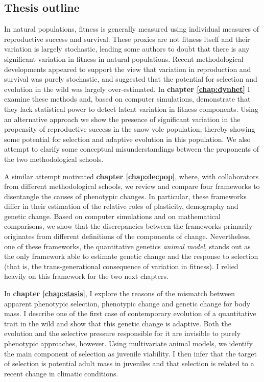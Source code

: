 \subsection{Thesis outline}

In natural populations, fitness is generally measured using individual measures of reproductive success and survival. These proxies are not fitness itself and their variation is largely stochastic, leading some authors to doubt that there is any significant variation in fitness in natural populations. Recent methodological developments appeared to support the view that variation in reproduction and survival was purely stochastic, and suggested that the potential for selection and evolution in the wild was largely over-estimated. In \textbf{chapter \ref{chap:dynhet}} I examine these methods and, based on computer simulations, demonstrate that they lack statistical power to detect latent variation in fitness components. Using an alternative approach we show the presence of significant variation in the propensity of reproductive success in the snow vole population, thereby showing some potential for selection and adaptive evolution in this population. We also attempt to clarify some conceptual misunderstandings between the proponents of the two methodological schools. 

A similar attempt motivated \textbf{chapter \ref{chap:decpop}}, where, with collaborators from different methodological schools, we review and compare four frameworks to disentangle the causes of phenotypic changes. In particular, these frameworks differ in their estimation of the relative roles of plasticity, demography and genetic change. Based on computer simulations and on mathematical comparisons, we show that the discrepancies between the frameworks primarily originates from different definitions of the components of change. Nevertheless, one of these frameworks, the quantitative genetics \emph{animal model}, stands out as the only framework able to estimate genetic change and the response to selection (that is, the trans-generational consequence of variation in fitness). I relied heavily on this framework for the two next chapters.  

In \textbf{chapter \ref{chap:stasis}}, I explore the reasons of the mismatch between apparent phenotypic selection, phenotypic change and genetic change for body mass. I describe one of the first case of contemporary evolution of a quantitative trait in the wild and show that this genetic change is adaptive. Both the evolution and the selective pressure responsible for it are invisible to purely phenotypic approaches, however. Using multivariate animal models, we identify the main component of selection as juvenile viability. I then infer that the target of selection is potential adult mass in juveniles and that selection is related to a recent change in climatic conditions. 

